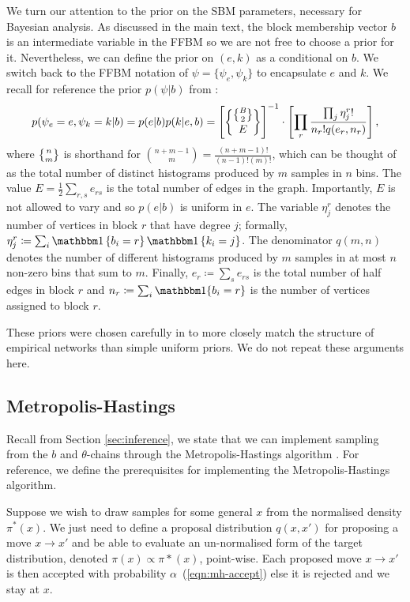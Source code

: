 We turn our attention to the prior on the SBM parameters, necessary for Bayesian analysis. As discussed in the main text, the block membership vector $b$ is an intermediate variable in the FFBM so we are not free to choose a prior for it. Nevertheless, we can define the prior on $(e,k)$ as a conditional on $b$. We switch back to the FFBM notation of $\psi = \{\psi_e, \psi_k\}$ to encapsulate $e$ and $k$. We recall for reference
the prior $p(\psi | b)$ from \cite{Peixoto-Bayesian-Microcanonical}:
%
\begin{equation}
	p(\psi_e=e, \psi_k=k | b) = p(e | b) p(k | e, b) = \left[ \specialchoose{ \specialchoose{B}{2} }{ E} \right]^{-1} 
	\cdot \left[ \prod_r \frac{\prod_j \eta_j^r !}{n_r! q(e_r, n_r)} \right],
\end{equation}
%
where $\specialchoose{n}{m}$ is shorthand 
for $\binom{n+m-1}{m} = \frac{(n+m-1)!}{(n-1)!(m)!}$,
which can be thought of as the total number of distinct histograms 
produced by $m$ samples in $n$ bins.
The value
$E = \frac{1}{2} \sum_{r,s} e_{rs}$ is the total number of edges in the graph. 
Importantly, $E$ is not allowed to vary and so $p(e|b)$ is uniform in $e$.
The variable $\eta_j^r$ denotes the number of vertices in block $r$ 
that have degree $j$; formally, $\eta_j^r \coloneqq \sum_{i} \one\left\{b_i = r \right\} \one \left\{k_i = j \right\}$. 
The denominator $q(m, n)$ denotes the number of different histograms 
produced by $m$ samples in 
at most $n$ non-zero bins that sum to $m$. 
Finally, $e_r \coloneqq \sum_{s} e_{rs}$ is the total number 
of half edges in block $r$ and $n_r \coloneqq \sum_{i} \one\{b_i = r\}$ 
is the number of vertices assigned to block $r$. 

These priors were chosen carefully in \cite{Peixoto-Bayesian-Microcanonical} to 
more closely match the structure of empirical networks than simple 
uniform priors. We do not repeat these arguments here.

\subsection{Metropolis-Hastings}
\label{appdx:metropolis-hastings}

Recall from Section \ref{sec:inference}, we state that we can implement sampling from the $b$ and $\theta$-chains through the Metropolis-Hastings algorithm \cite{hastings-alg}. For reference, we define the prerequisites for implementing the Metropolis-Hastings algorithm.

Suppose we wish to draw samples for some general $x$ from the normalised density $\pi^*(x)$. We just need to define a proposal distribution $q(x, x')$ for proposing a move $x \rightarrow x'$ and be able to evaluate an un-normalised form of the target distribution, denoted $\pi(x) \propto \pi*(x)$, point-wise. Each proposed move $x \rightarrow x'$ is then accepted with probability $\alpha$~(\ref{eqn:mh-accept}) else it is rejected and we stay at $x$.

